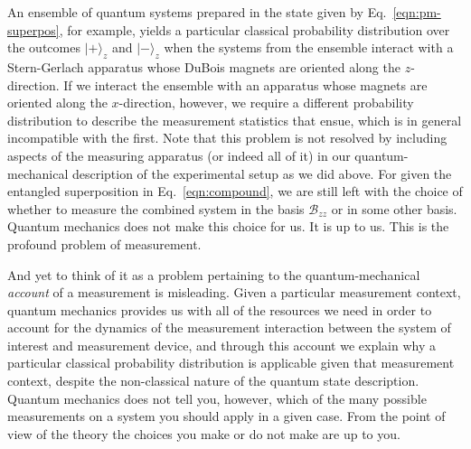 An ensemble of quantum systems prepared in the state given by Eq.\ \eqref{eqn:pm-superpos}, for example, yields a particular classical probability distribution over the outcomes $| + \rangle_z$ and $| - \rangle_z$ when the systems from the ensemble interact with a Stern-Gerlach apparatus whose DuBois magnets are oriented along the $z$-direction. If we interact the ensemble with an apparatus whose magnets are oriented along the $x$-direction, however, we require a different probability distribution to describe the measurement statistics that ensue, which is in general incompatible with the first. Note that this problem is not resolved by including aspects of the measuring apparatus (or indeed all of it) in our quantum-mechanical description of the experimental setup as we did above. For given the entangled superposition in Eq.\ \eqref{eqn:compound}, we are still left with the choice of whether to measure the combined system in the basis $\mathcal{B}_{zz}$ or in some other basis. Quantum mechanics does not make this choice for us. It is up to us. This is the profound problem of measurement.

And yet to think of it as a problem pertaining to the quantum-mechanical \emph{account} of a measurement is misleading. Given a particular measurement context, quantum mechanics provides us with all of the resources we need in order to account for the dynamics of the measurement interaction between the system of interest and measurement device, and through this account we explain why a particular classical probability distribution is applicable given that measurement context, despite the non-classical nature of the quantum state description. Quantum mechanics does not tell you, however, which of the many possible measurements on a system you should apply in a given case. From the point of view of the theory the choices you make or do not make are up to you.
